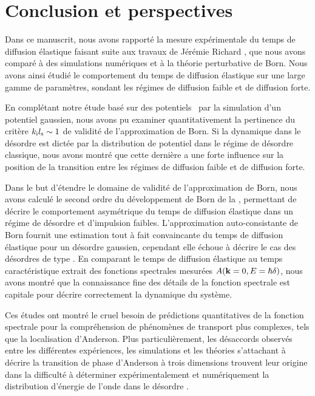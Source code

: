
\chapter{Conclusion et perspectives}

Dans ce manuscrit, nous avons rapporté la mesure expérimentale du temps de diffusion élastique faisant suite aux travaux de Jérémie Richard \citep{richard2015propagation}, que nous avons comparé à des simulations numériques et à la théorie perturbative de Born. Nous avons ainsi étudié le comportement du temps de diffusion élastique sur une large gamme de paramètres, sondant les régimes de diffusion faible et de diffusion forte.  

En complétant notre étude basé sur des potentiels \speckle\ par la simulation d'un potentiel gaussien, nous avons pu examiner quantitativement la pertinence du critère $k_{\mathrm{i}}l_{\mathrm{s}}\sim 1$ de validité de l'approximation de Born. Si la dynamique dans le désordre est dictée par la distribution de potentiel dans le régime de désordre classique, nous avons montré que cette dernière a une forte influence sur la position de la transition entre les régimes de diffusion faible et de diffusion forte. 

Dans le but d'étendre le domaine de validité de l'approximation de Born, nous avons calculé le second ordre du développement de Born de la \selfenergy , permettant de décrire le comportement asymétrique du temps de diffusion élastique dans un régime de désordre et d'impulsion faibles. L'approximation auto-consistante de Born fournit une estimation tout à fait convaincante du temps de diffusion élastique pour un désordre gaussien, cependant elle échoue à décrire le cas des désordres de type \speckle . En comparant le temps de diffusion élastique au temps caractéristique extrait des fonctions spectrales mesurées $A(\mathbf{k}=0,E=\hslash\delta)$, nous avons montré que la connaissance fine des détails de la fonction spectrale est capitale pour décrire correctement la dynamique du système. 

Ces études ont montré le cruel besoin de prédictions quantitatives de la fonction spectrale pour la compréhension de phénomènes de transport plus complexes, tels que la localisation d'Anderson. Plus particulièrement, les désaccords observés entre les différentes expériences, les simulations et les théories s'attachant à décrire la transition de phase d'Anderson à trois dimensions trouvent leur origine dans la difficulté à déterminer expérimentalement et numériquement la distribution d'énergie de l'onde dans le désordre \citep{pasek2017anderson}.









